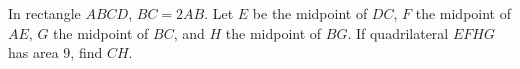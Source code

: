 In rectangle $ABCD$, $BC=2AB$. Let $E$ be the midpoint of $DC$, $F$ the midpoint of $AE$, $G$ the midpoint of $BC$, and $H$ the midpoint of $BG$. If quadrilateral $EFHG$ has area 9, find $CH$.
